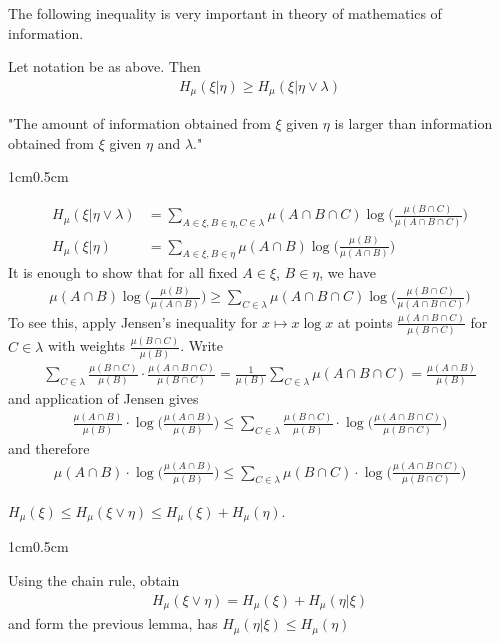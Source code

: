 \documentclass[10pt,a4paper]{report}
\newenvironment{proof}
{\begin{changemargin}{1cm}{0.5cm} 
	}%
	{\end{changemargin}
}
\begin{document}
The following inequality is very important in theory of mathematics of information.
\s

\lem Let notation be as above. Then
\begin{align*}
H_{\mu}(\xi | \eta) \geq H_{\mu}(\xi | \eta \vee \lambda)
\end{align*}

"The amount of information obtained from $\xi$ given $\eta$ is larger than information obtained from $\xi$ given $\eta$ and $\lambda$."
\begin{proof}
\pf 
\begin{align*}
H_{\mu}(\xi | \eta \vee \lambda) &= \sum_{A \in \xi, B \in \eta, C \in \lambda} \mu(A\cap B \cap C) \log \Big( \frac{\mu(B\cap C)}{\mu(A\cap B \cap C)}\Big) \\
H_{\mu}(\xi | \eta ) &= \sum_{A \in \xi, B \in \eta} \mu(A\cap B ) \log \Big( \frac{\mu(B)}{\mu(A\cap B )}\Big)
\end{align*}
It is enough to show that for all fixed $A \in \xi$, $B\in \eta$, we have
\begin{align*}
\mu(A\cap B) \log \Big( \frac{\mu(B)}{\mu(A\cap B)}\Big) \geq \sum_{C \in \lambda} \mu(A \cap B \cap C) \log \Big( \frac{\mu(B\cap C)}{\mu(A\cap B \cap C)} \Big)
\end{align*}
To see this, apply Jensen's inequality for $x\mapsto x\log x$ at points $\frac{\mu(A\cap B\cap C)}{\mu(B \cap C)}$ for $C \in \lambda$ with weights $\frac{\mu(B\cap C)}{\mu(B)}$. Write
\begin{align*}
\sum_{C\in \lambda } \frac{\mu(B\cap C)}{\mu(B)} \cdot \frac{\mu(A\cap B \cap C)}{\mu(B\cap C)} = \frac{1}{\mu(B)} \sum_{C\in \lambda} \mu(A\cap B \cap C) = \frac{\mu(A\cap B)}{\mu(B)}
\end{align*}
and application of Jensen gives
\begin{align*}
\frac{\mu(A\cap B)}{\mu(B)}\cdot \log \Big( \frac{\mu(A\cap B)}{\mu(B)} \Big) \leq \sum_{C\in \lambda} \frac{\mu(B\cap C)}{\mu(B)} \cdot \log\Big( \frac{\mu(A\cap B \cap C)}{\mu(B\cap C)} \Big)
\end{align*}
and therefore
\begin{align*}
\mu(A\cap B)\cdot \log \Big( \frac{\mu(A\cap B)}{\mu(B)} \Big) \leq \sum_{C\in \lambda} \mu(B\cap C) \cdot \log \Big( \frac{\mu(A\cap B \cap C)}{\mu(B\cap C)} \Big)
\end{align*}

\eop
\end{proof}
\s

\cor $H_{\mu}(\xi) \leq H_{\mu}(\xi \vee \eta) \leq H_{\mu}(\xi) + H_{\mu}(\eta)$.
\begin{proof}
\pf Using the chain rule, obtain
\begin{align*}
H_{\mu}(\xi \vee \eta) = H_{\mu} (\xi)  + H_{\mu}(\eta | \xi)
\end{align*}
and form the previous lemma, has $H_{\mu}(\eta |\xi) \leq H_{\mu}(\eta)$

\eop
\end{proof}
\s
\end{document}
